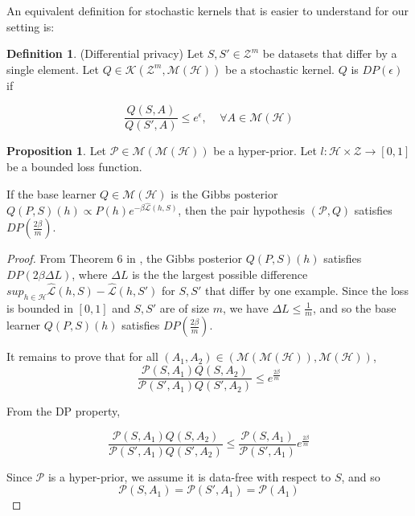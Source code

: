 \documentclass[letterpaper]{article} %
\theoremstyle{definition}
\newtheorem{defn}{Definition}[section]
\newtheorem{proposition}[theorem]{Proposition}
\begin{document}
An equivalent definition for stochastic kernels that is easier to understand for our setting is:

\begin{defn} (Differential privacy)
	Let $S,S'\in \mathcal{Z}^m$ be datasets that differ by a single element.
	Let $Q\in \mathcal{K}(\mathcal{Z}^m, \mathcal{M}(\mathcal{H}))$ be a stochastic kernel.
	$Q$ is $DP(\epsilon)$ if 
	
	$$\frac{Q(S, A)}{Q(S', A)} \leq e^\epsilon, \;\;\;\; \forall A\in  \mathcal{M}(\mathcal{H})$$
\end{defn}

\begin{proposition} \label{thm:pair-is-dp-appendix}
	Let $\mathcal{P}\in \mathcal{M}(\mathcal{M}(\mathcal{H}))$ be a hyper-prior.
	Let $l:\mathcal{H}\times \mathcal{Z}\rightarrow [0,1]$ be a bounded loss function.
	
	If the base learner $Q\in \mathcal{M}(\mathcal{H})$ is the Gibbs posterior $Q(P, S)(h)\propto P(h)e^{-\beta\hat{\mathcal{L}}(h, S)}$, 
	then the pair hypothesis $(\mathcal{P}, Q)$ satisfies $DP\left (\frac{2\beta}{m}\right )$.
\end{proposition}

\begin{proof}
	From Theorem 6 in \citet{McSherry2007}, the Gibbs posterior $Q(P, S)(h)$ satisfies $DP\left (2\beta\Delta L\right )$, where $\Delta L$ is the the largest possible difference  $sup_{h\in\mathcal{H}}\hat{\mathcal{L}}(h,S)-\hat{\mathcal{L}}(h,S')$ for $S,S'$ that differ by one example. Since the loss is bounded in $[0,1]$ and $S,S'$ are of size $m$, we have $\Delta L\leq \frac{1}{m}$, and so the base learner $Q(P, S)(h)$ satisfies $DP\left (\frac{2\beta}{m}\right )$.
	
	
	It remains to prove that for all $(A_1,A_2)\in (\mathcal{M}(\mathcal{M}(\mathcal{H})), \mathcal{M}(\mathcal{H}))$, 
	$$ \frac{\mathcal{P}(S, A_1)Q(S,A_2)}{\mathcal{P}(S', A_1)Q(S',A_2)}\leq e^{\frac{2\beta}{m}}$$
	
	From the DP property, 
	
	$$ \frac{\mathcal{P}(S, A_1)Q(S,A_2)}{\mathcal{P}(S', A_1)Q(S',A_2)}\leq \frac{\mathcal{P}(S, A_1)}{\mathcal{P}(S', A_1)}e^{\frac{2\beta}{m}}$$
	
	Since $\mathcal{P}$ is a hyper-prior, we assume it is data-free with respect to $S$, and so 
	$$\mathcal{P}(S, A_1)=\mathcal{P}(S', A_1)=\mathcal{P}(A_1)$$
	
\end{proof}
\end{document}
